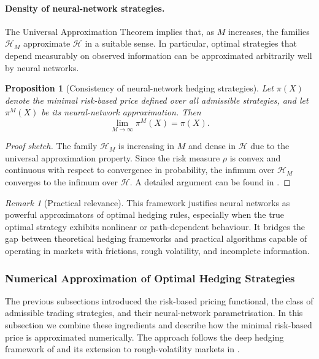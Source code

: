 \documentclass[12pt,a4paper]{article}
\theoremstyle{definition}
\theoremstyle{plain}
\newtheorem{proposition}{Proposition}[section]
\theoremstyle{remark}
\newtheorem{remark}{Remark}[section]
\theoremstyle{plain}
\begin{document}
\paragraph{Density of neural-network strategies.}
The Universal Approximation Theorem implies that, as $M$ increases, the families $\mathcal{H}_M$ approximate $\mathcal{H}$ in a suitable sense. 
In particular, optimal strategies that depend measurably on observed information can be approximated arbitrarily well by neural networks.

\begin{proposition}[Consistency of neural-network hedging strategies]
\label{prop:NN_consistency}
Let $\pi(X)$ denote the minimal risk-based price defined over all admissible strategies, and let $\pi^{M}(X)$ be its neural-network approximation. 
Then
\[
    \lim_{M \to \infty} \pi^{M}(X) = \pi(X).
\]
\end{proposition}

\begin{proof}[Proof sketch]
The family $\mathcal{H}_M$ is increasing in $M$ and dense in $\mathcal{H}$ due to the universal approximation property. 
Since the risk measure $\rho$ is convex and continuous with respect to convergence in probability, the infimum over $\mathcal{H}_M$ converges to the infimum over $\mathcal{H}$. 
A detailed argument can be found in \cite{Buehler2019DeepHedging}.
\end{proof}

\begin{remark}[Practical relevance]\label{rem:nn_practical_relevance}
This framework justifies neural networks as powerful approximators of optimal hedging rules, especially when the true optimal strategy exhibits nonlinear or path-dependent behaviour. 
It bridges the gap between theoretical hedging frameworks and practical algorithms capable of operating in markets with frictions, rough volatility, and incomplete information.
\end{remark}

\subsubsection{Numerical Approximation of Optimal Hedging Strategies}

The previous subsections introduced the risk-based pricing functional, the class of admissible trading strategies, and their neural-network parametrisation. 
In this subsection we combine these ingredients and describe how the minimal risk-based price is approximated numerically.
The approach follows the deep hedging framework of \cite{Buehler2019DeepHedging} and its extension to rough-volatility markets in \cite{Horvath2021DeepRough}.
\end{document}
